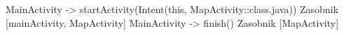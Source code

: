 MainActivity -> startActivity(Intent(this, MapActivity::class.java))
Zasobnik [mainActivity, MapActivity]
MainActivity -> finish()
Zasobnik [MapActivity]



